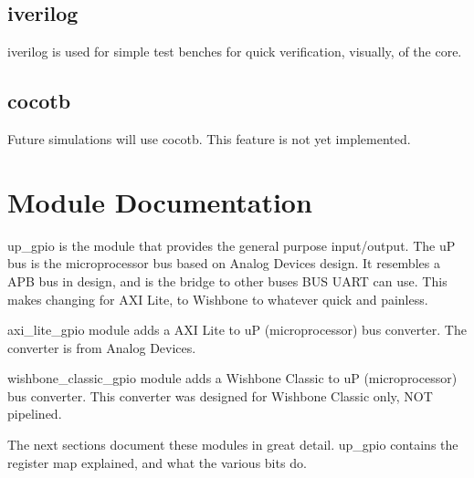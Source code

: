 \subsection{iverilog}
\par
iverilog is used for simple test benches for quick verification, visually, of the core.

\subsection{cocotb}
\par
Future simulations will use cocotb. This feature is not yet implemented.

\newpage

\section{Module Documentation} \label{Module Documentation}

\par
up\_gpio is the module that provides the general purpose input/output.
The uP bus is the microprocessor bus based on Analog Devices design. It resembles a APB bus in design,
and is the bridge to other buses BUS UART can use. This makes changing for AXI Lite, to Wishbone to whatever
quick and painless.

\par
axi\_lite\_gpio module adds a AXI Lite to uP (microprocessor) bus converter. The converter is
from Analog Devices.

\par
wishbone\_classic\_gpio module adds a Wishbone Classic to uP (microprocessor) bus converter. This
converter was designed for Wishbone Classic only, NOT pipelined.

\vspace{15mm}
\par
The next sections document these modules in great detail. up\_gpio contains the register map explained, and what the various bits do.

